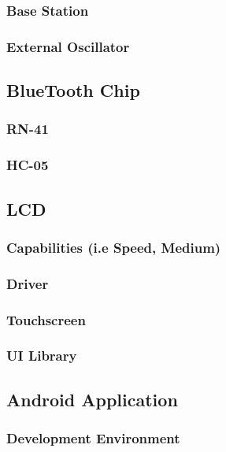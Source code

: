   \subsubsection{Base Station}
\lipsum[1]
  \subsubsection{External Oscillator}
\lipsum[1]
 \subsection{BlueTooth Chip}
\lipsum[1]
  \subsubsection{RN-41}
\lipsum[1]
  \subsubsection{HC-05}
\lipsum[1]
 \subsection{LCD}
\lipsum[1]
  \subsubsection{Capabilities (i.e Speed, Medium)}
\lipsum[1]
  \subsubsection{Driver}
\lipsum[1]
  \subsubsection{Touchscreen}
\lipsum[1]
  \subsubsection{UI Library}
\lipsum[1]
 \subsection{Android Application}
\lipsum[1]
  \subsubsection{Development Environment}
\lipsum[1]
